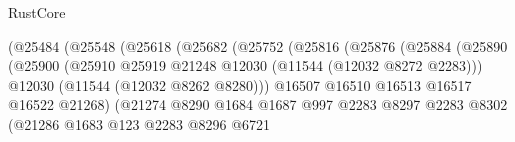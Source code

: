\begin{lexlean}{RustCore}
\begin{coremodule}
                                            (@25484
                                              (@25548
                                                (@25618
                                                  (@25682
                                                    (@25752
                                                      (@25816
                                                        (@25876
                                                          (@25884
                                                            (@25890
                                                              (@25900
                                                                (@25910
                                                                  @25919
                                                                  @21248
                                                                  @12030
                                                                  (@11544 (@12032 @8272 @2283)))
                                                                @12030
                                                                (@11544 (@12032 @8262 @8280)))
                                                              @16507
                                                              @16510
                                                              @16513
                                                              @16517
                                                              @16522
                                                              @21268)
                                                            (@21274
                                                              @8290
                                                              @1684
                                                              @1687
                                                              @997
                                                              @2283
                                                              @8297
                                                              @2283
                                                              @8302
                                                              (@21286
                                                                @1683
                                                                @123
                                                                @2283
                                                                @8296
                                                                @6721

\end{coremodule}
\end{lexlean}
